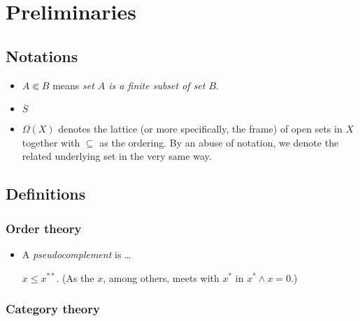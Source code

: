 \chapter*{Preliminaries}

\section*{Notations}

\begin{itemize}
\item $A \Subset B$ means {\sl set $A$ is a finite subset of set $B$\/}.
\item $\overline{S}$ 
\item $\Omega(X)$ denotes the lattice (or more specifically, the frame) of open
sets in $X$ together with $\subseteq$ as the ordering. 
By an abuse of notation, we denote the related underlying set in the very same
way.
\end{itemize}

\section*{Definitions}

\subsection*{Order theory}

\begin{itemize}
\item A \emph{pseudocomplement} is \ldots
  \begin{fact}
    $x \le x^{**}$.
    (As the $x$, among others, meets with $x^*$ in $x^* \wedge x = 0$.)
  \end{fact}
\end{itemize}

\subsection*{Category theory}

